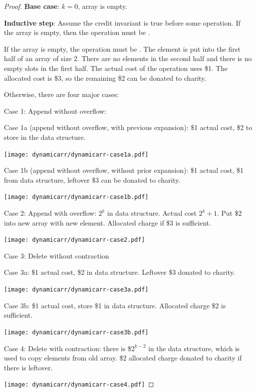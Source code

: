 \begin{proof}

    \hfill

    \textbf{Base case}: $k=0$, array is empty. 
    
    \textbf{Inductive step}: Assume the credit invariant is true before some operation. If the array is empty, then the operation must be .

    If the array is empty, the operation must be . The element is put into the first half of an array of size 2. There are no elements in the second half and there is no empty slots in the first half. The actual cost of the operation uses \$1. The allocated cost is \$3, so the remaining \$2 can be donated to charity.

    Otherwise, there are four major cases:

    Case 1: Append without overflow:

    Case 1a (append without overflow, with previous expansion): \$1 actual cost, \$2 to store in the data structure.

    \texttt{[image: dynamicarr/dynamicarr-case1a.pdf]}

    Case 1b (append without overflow, without prior expansion): \$1 actual cost, \$1 from data structure, leftover \$3 can be donated to charity.
    
    \texttt{[image: dynamicarr/dynamicarr-case1b.pdf]}

    Case 2: Append with overflow: $2^k$ in data structure. Actual cost $2^k+1$. Put \$2 into new array with new element. Allocated charge if \$3 is sufficient.

    \texttt{[image: dynamicarr/dynamicarr-case2.pdf]}

    Case 3: Delete without contraction

    Case 3a: \$1 actual cost, \$2 in data structure. Leftover \$3 donated to charity.

    \texttt{[image: dynamicarr/dynamicarr-case3a.pdf]}

    Case 3b: \$1 actual cost, store \$1 in data structure. Allocated charge \$2 is sufficient.

    \texttt{[image: dynamicarr/dynamicarr-case3b.pdf]}

    Case 4: Delete with contraction: there is \$$2^{k-2}$ in the data structure, which is used to copy elements from old array. \$2 allocated charge donated to charity if there is leftover.

    \texttt{[image: dynamicarr/dynamicarr-case4.pdf]}
\end{proof}

